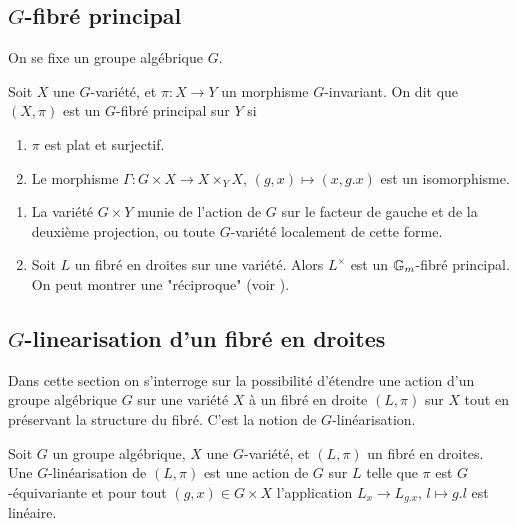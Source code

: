 \subsection{$G$-fibré principal}

\noindent On se fixe un groupe algébrique $G$.

\begin{defn}\label{GPrincipalBundleDef}
Soit $X$ une $G$-variété, et $\pi:X\rightarrow Y$ un morphisme $G$-invariant. On dit que $(X,\pi)$ est un $G$-fibré principal sur $Y$ si
\begin{enumerate}
\item $\pi$ est plat et surjectif.
\item Le morphisme $\Gamma:G\times X\rightarrow X\times_Y X$, $(g,x)\mapsto (x,g.x)$ est un isomorphisme.
\end{enumerate}
\end{defn}

\begin{ex}
\begin{enumerate}
\item La variété $G\times Y$ munie de l'action de $G$ sur le facteur de gauche et de la deuxième projection, ou toute $G$-variété localement de cette forme.
\item Soit $L$ un fibré en droites sur une variété. Alors $L^\times$ est un $\mathbb{G}_m$-fibré principal. On peut montrer une "réciproque" (voir \cite[3.1.3]{LinearizationGBrion}).
\end{enumerate}
\end{ex}

\subsection{$G$-linearisation d'un fibré en droites}

Dans cette section on s'interroge sur la possibilité d'étendre une action d'un groupe algébrique $G$ sur une variété $X$ à un fibré en droite $(L,\pi)$ sur $X$ tout en préservant la structure du fibré. C'est la notion de $G$-linéarisation. 

\begin{defn}[$G$-linéarisation]
Soit $G$ un groupe algébrique, $X$ une $G$-variété, et $(L,\pi)$ un fibré en droites. Une $G$-linéarisation de  $(L,\pi)$ est une action de $G$ sur $L$ telle que $\pi$ est $G$-équivariante et pour tout $(g,x)\in G\times X$ l'application $L_x\rightarrow L_{g.x},\, l\mapsto g.l$ est linéaire.
\end{defn}

